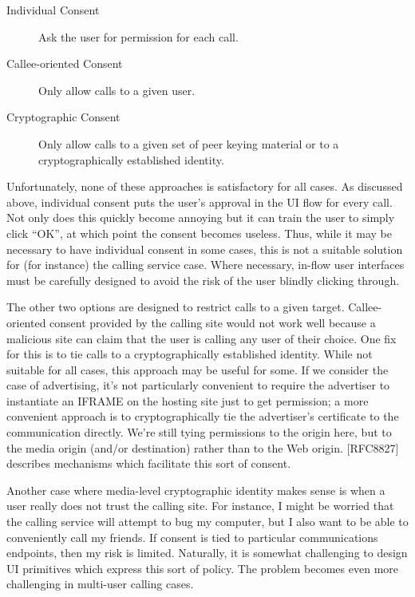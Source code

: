 \documentclass{article}
\begin{document}
\begin{description}
\item[Individual Consent]
   Ask the user for permission for each call.

\item[Callee-oriented Consent]
   Only allow calls to a given user.

\item[Cryptographic Consent]
   Only allow calls to a given set of peer keying material or to a
   cryptographically established identity.
\end{description}

Unfortunately, none of these approaches is satisfactory for all
cases.  As discussed above, individual consent puts the user's
approval in the UI flow for every call.  Not only does this quickly
become annoying but it can train the user to simply click ``OK'', at
which point the consent becomes useless.  Thus, while it may be
necessary to have individual consent in some cases, this is not a
suitable solution for (for instance) the calling service case.  Where
necessary, in-flow user interfaces must be carefully designed to
avoid the risk of the user blindly clicking through.

The other two options are designed to restrict calls to a given
target.  Callee-oriented consent provided by the calling site would
not work well because a malicious site can claim that the user is
calling any user of their choice.  One fix for this is to tie calls
to a cryptographically established identity.  While not suitable for
all cases, this approach may be useful for some.  If we consider the
case of advertising, it's not particularly convenient to require the
advertiser to instantiate an IFRAME on the hosting site just to get
permission; a more convenient approach is to cryptographically tie
the advertiser's certificate to the communication directly.  We're
still tying permissions to the origin here, but to the media origin
(and/or destination) rather than to the Web origin.  [RFC8827]
describes mechanisms which facilitate this sort of consent.

Another case where media-level cryptographic identity makes sense is
when a user really does not trust the calling site.  For instance, I
might be worried that the calling service will attempt to bug my
computer, but I also want to be able to conveniently call my friends.
If consent is tied to particular communications endpoints, then my
risk is limited.  Naturally, it is somewhat challenging to design UI
primitives which express this sort of policy.  The problem becomes
even more challenging in multi-user calling cases.
\end{document}
